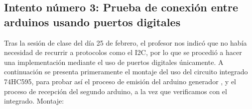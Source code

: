 \documentclass{article}
\begin{document}
\subsection{Intento número 3: Prueba de conexión entre arduinos usando puertos digitales}\label{intento3}
Tras la sesión de clase del día 25 de febrero, el profesor nos indicó que no había necesidad de recurrir a protocolos como el I2C, por lo que se procedió a hacer una implementación mediante el uso de puertos digitales únicamente. \newline A continuación se presenta primeramente el montaje del uso del circuito integrado 74HC595, para probar así el proceso de emisión del arduino generador , y el proceso de recepción del segundo arduino, a la vez que verificamos con el integrado.
\newline Montaje: \newline \newline \newline
\end{document}

